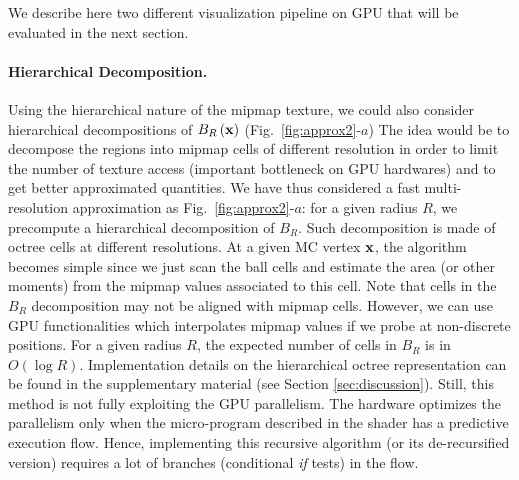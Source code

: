 \documentclass{llncs}
\newcommand{\wrt}{\emph{w.r.t.} }
\begin{document}
We describe here two different visualization pipeline on GPU that will
be evaluated in the next section.

\paragraph{Hierarchical Decomposition.}  
\color{blue}
Using the hierarchical nature of the mipmap texture, we could also
consider hierarchical decompositions of $B_{R}\left(\mathbf{x}\right)$
(Fig.~\ref{fig:approx2}-$a$) 
The idea would be to decompose the
regions into mipmap cells of different resolution in order to limit
the number of texture access (important bottleneck on GPU hardwares)
and to get better approximated quantities. 
We have thus considered a fast multi-resolution approximation as
Fig.~\ref{fig:approx2}-$a$: for a given radius $R$, we precompute a
hierarchical decomposition of $B_R$. Such decomposition is made of
octree cells at different resolutions. At a given MC vertex $\mathbf{x}$, the
algorithm becomes simple since we just scan the ball cells and
estimate the area (or other moments) from the mipmap values associated
to this cell. Note that cells in the $B_R$ decomposition may not be
aligned with mipmap cells. However, we can use GPU %
functionalities which interpolates mipmap values if we probe at
non-discrete positions. For a given radius $R$, the expected number of
cells in $B_R$ is in $O(\log{R})$. Implementation details on the
hierarchical octree representation can be found in the supplementary
material (see Section \ref{sec:discussion}).
Still, this method is not fully exploiting the GPU parallelism. 
The hardware optimizes the parallelism only
when the micro-program described in the shader has a predictive
execution flow. Hence, implementing this recursive algorithm (or its
de-recursified version) requires a lot of branches (conditional
\emph{if} tests) in the flow. 
\normalcolor
\end{document}
